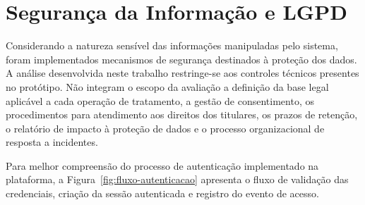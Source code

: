 \section{Segurança da Informação e LGPD}

Considerando a natureza sensível das informações manipuladas pelo sistema, foram implementados mecanismos de segurança destinados à proteção dos dados. A análise desenvolvida neste trabalho restringe-se aos controles técnicos presentes no protótipo. Não integram o escopo da avaliação a definição da base legal aplicável a cada operação de tratamento, a gestão de consentimento, os procedimentos para atendimento aos direitos dos titulares, os prazos de retenção, o relatório de impacto à proteção de dados e o processo organizacional de resposta a incidentes.

Para melhor compreensão do processo de autenticação implementado na plataforma, a Figura~\ref{fig:fluxo-autenticacao} apresenta o fluxo de validação das credenciais, criação da sessão autenticada e registro do evento de acesso.

